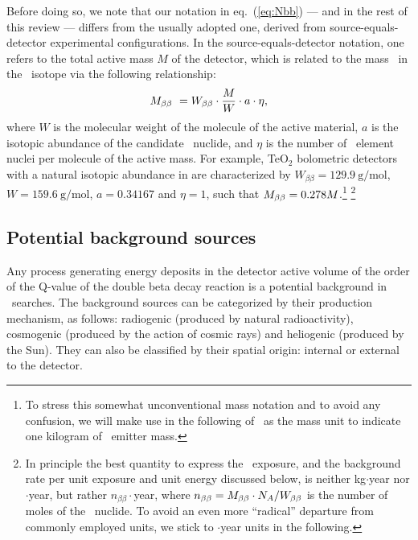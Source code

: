 Before doing so, we note that our notation in eq.~(\ref{eq:Nbb}) --- and in the rest of this review --- differs from the usually adopted one, derived from source-equals-detector experimental configurations. In the source-equals-detector notation, one refers to the total active mass $M$ of the detector, which is related to the mass \Mbb\ in the \bb\ isotope via the following relationship:
%
\begin{equation}
M_{\beta\beta}\ = W_{\beta\beta}\cdot \frac{M}{W}\cdot a\cdot \eta ,
\label{eq:mbbversusm}
\end{equation}
%
where $W$ is the molecular weight of the molecule of the active material, $a$ is the isotopic abundance of the candidate \bbonu\ nuclide, and $\eta$ is the number of \bbonu\ element nuclei per molecule of the active mass. For example, TeO$_2$ bolometric detectors with a natural isotopic abundance in  are characterized by $W_{\beta\beta}=129.9\ \mathrm{g/mol}$, $W=159.6\ \mathrm{g/mol}$, $a=0.34167$ and $\eta=1$, such that $M_{\beta\beta} = 0.278 M$.\footnote{To stress this somewhat unconventional mass notation and to avoid any confusion, we will make use in the following of \kgbb\ as the mass unit to indicate one kilogram of \bb\ emitter mass.} \footnote{In principle the best quantity to express the \bbonu\ exposure, and the background rate per unit exposure and unit energy discussed below, is neither kg$\cdot$year nor \kgbb $\cdot$year, but rather $n_{\beta\beta}\cdot$year, where $n_{\beta\beta}=M_{\beta\beta} \cdot N_A/W_{\beta\beta}$ is the number of moles of the \bb\ nuclide. To avoid an even more ``radical'' departure from commonly employed units, we stick to \kgbb$\cdot$year units in the following.}


\subsection{Potential background sources} \label{subsec:bgr_sources}

Any process generating energy deposits in the detector active volume of the order of the Q-value of the double beta decay reaction is a potential background in \bbonu\ searches. The background sources can be categorized by their production mechanism, as follows: radiogenic (produced by natural radioactivity), cosmogenic (produced by the action of cosmic rays) and heliogenic (produced by the Sun). They can also be classified by their spatial origin: internal or external to the detector.

